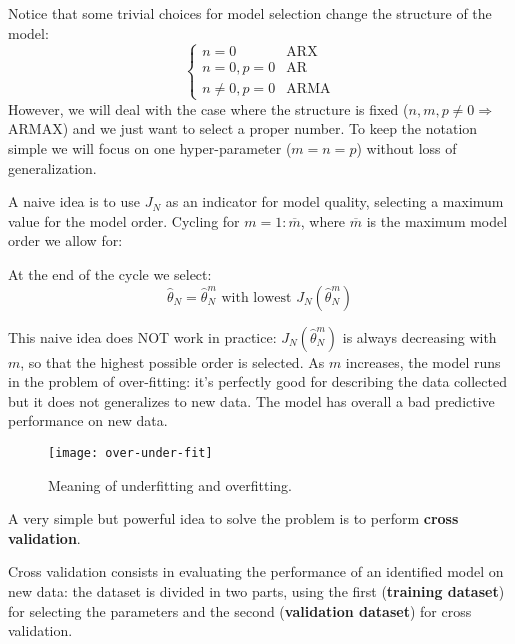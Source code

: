 Notice that some trivial choices for model selection change the structure of the model:
\begin{equation*}
\begin{cases}
n=0 & \text{ARX}\\
n=0,p=0 & \text{AR}\\
n\neq 0,p=0 & \text{ARMA}
\end{cases}
\end{equation*}
However, we will deal with the case where the structure is fixed ($ n,m,p\neq 0\Longrightarrow$ ARMAX) and we just want to select a proper number. To keep the notation simple we will focus on one hyper-parameter ($ m=n=p$) without loss of generalization.

A naive idea is to use $ J_{N}$ as an indicator for model quality, selecting a maximum value for the model order. Cycling for $ m=1:\overline{m}$, where $\overline{m}$ is the maximum model order we allow for:


At the end of the cycle we select:
\begin{equation*}
\hat{\theta }_{N} =\hat{\theta }_{N}^{m} \text{ with lowest } J_{N}(\hat{\theta }_{N}^{m})
\end{equation*}
\begin{rem}
	This naive idea does NOT work in practice: $ J_{N}(\hat{\theta }_{N}^{m})$ is always decreasing with $ m$, so that the highest possible order is selected. As $m$ increases, the model runs in the problem of over-fitting: it's perfectly good for describing the data collected but it does not generalizes to new data. The model has overall a bad predictive performance on new data.
\end{rem}
\begin{figure}[htpb]
    \centering
    \texttt{[image: over-under-fit]}
    \caption{Meaning of underfitting and overfitting.}
\end{figure}
\FloatBarrier
A very simple but powerful idea to solve the problem is to perform \textbf{cross validation}.

Cross validation consists in evaluating the performance of an identified model on new data: the dataset is divided in two parts, using the first (\textbf{training dataset}) for selecting the parameters and the second (\textbf{validation dataset}) for cross validation.

